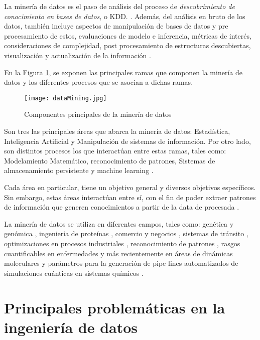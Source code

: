 La minería de datos es el paso de análisis del proceso de \textit{descubrimiento de conocimiento en bases de datos}, o KDD. \cite{fayyad1996kdd}. Además, del análisis en bruto de los datos, también incluye aspectos de manipulación de bases de datos y pre procesamiento de estos, evaluaciones de modelo e inferencia, métricas de interés, consideraciones de complejidad, post procesamiento de estructuras descubiertas, visualización y actualización de la información \cite{berry2004data}.

En la Figura \ref{intro1}, se exponen las principales ramas que componen la minería de datos y los diferentes procesos que se asocian a dichas ramas.

\begin{figure}[!h]
	
	\centering
	\texttt{[image: dataMining.jpg]}
	\caption{Componentes principales de la minería de datos}
	\label{intro1}
\end{figure}

Son tres las principales áreas que abarca la minería de datos: Estadística, Inteligencia Artificial y Manipulación de sistemas de información. Por otro lado, son distintos procesos los que interactúan entre estas ramas, tales como: Modelamiento Matemático, reconocimiento de patrones, Sistemas de almacenamiento persistente y machine learning \cite{hand2006data}.

Cada área en particular, tiene un objetivo general y diversos objetivos específicos. Sin embargo, estas áreas interactúan entre sí, con el fin de poder extraer patrones de información que generen conocimientos a partir de la data de procesada \cite{berry2004data}.

La minería de datos se utiliza en diferentes campos, tales como: genética y genómica \cite{Lee2008, Rebhan1998}, ingeniería de proteínas \cite{han2009research, 4548625, li2008fast}, comercio y negocios \cite{hofmann2013rapidminer}, sistemas de tránsito \cite{Ma2013}, optimizaciones en procesos industriales \cite{Chien2008, 8051033, 983448}, reconocimiento de patrones \cite{jain1988algorithms, fayyad1996data}, rasgos cuantificables en enfermedades \cite{Yoo2012, obenshain2004, LDuan} y más recientemente en áreas de dinámicas moleculares \cite{Chen2017, Yang:2005:GFM:1081870.1081962} y parámetros para la generación de pipe lines automatizados de simulaciones cuánticas en sistemas químicos \cite{MAO2004787, PhysRevLett.91.135503, Ramakrishnan2015}.


\section{Principales problemáticas en la ingeniería de datos}

